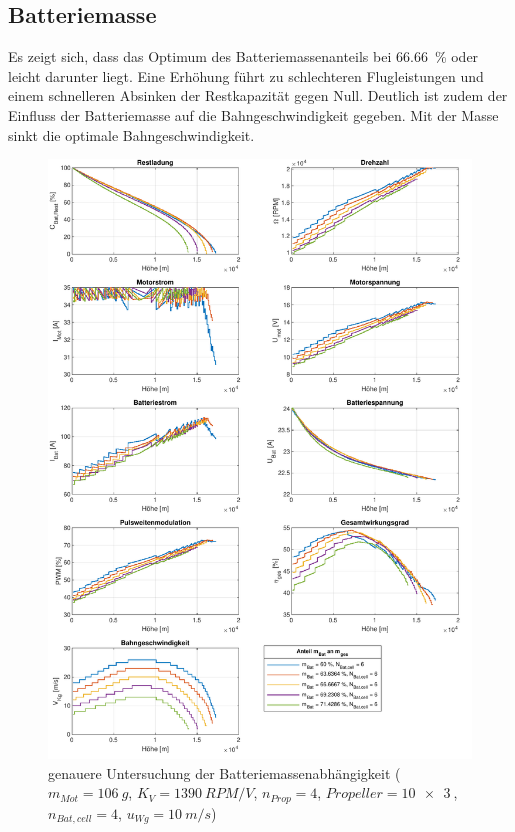 \begin{appendix}
\section{Batteriemasse}
Es zeigt sich, dass das Optimum des Batteriemassenanteils bei \SI{66.66}{\%} oder leicht darunter liegt. Eine Erhöhung führt zu schlechteren Flugleistungen und einem schnelleren Absinken der Restkapazität gegen Null. Deutlich ist zudem der Einfluss der Batteriemasse auf die Bahngeschwindigkeit gegeben. Mit der Masse sinkt die optimale Bahngeschwindigkeit. 
\begin{figure}[H]
\centering
	\includegraphics[scale=0.7]{Diagramme/Batteriemasse_genauer.pdf}
	\caption{genauere Untersuchung der Batteriemassenabhängigkeit (\ensuremath{m_{Mot}=\SI{106}{g}}, \ensuremath{K_V=\SI{1390}{RPM/V}}, \ensuremath{n_{Prop}=4}, \ensuremath{Propeller=\SI{10x3}{}}, \ensuremath{n_{Bat,cell}=4}, \ensuremath{u_{Wg}=\SI{10}{m/s}})}
	\label{abb:batteriemasse_genauer}
\end{figure}





\end{appendix}
